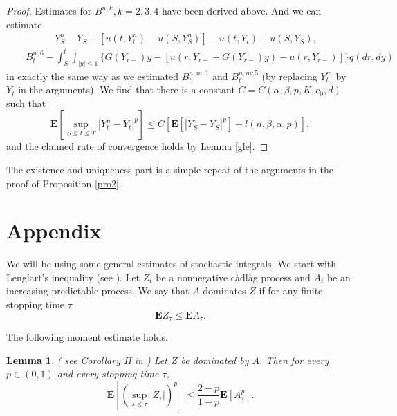 \documentclass[11pt]{amsart}
\theoremstyle{plain}
\newtheorem{lemma}{Lemma}
\numberwithin{equation}{section}
\begin{document}
\begin{proof}
Estimates for $B^{n,k},k=2,3,4$ have been derived above. And we can estimate 
\begin{eqnarray*}
&&\qquad \quad Y_{S}^{n}-Y_{S}+[u\left( t,Y_{t}^{n}\right) -u\left(
S,Y_{S}^{n}\right) ]-u\left( t,Y_{t}\right) -u\left( S,Y_{S}\right) , \\
&&B_{t}^{n,6}-\int_{S}^{t}\int_{\left\vert y\right\vert \leq 1}\{G\left(
Y_{r-}\right) y-\left[ u\left( r,Y_{r-}+G\left( Y_{r-}\right) y\right)
-u\left( r,Y_{r-}\right) \right] \}q\left( dr,dy\right)
\end{eqnarray*}in exactly the same way as we estimated $B_{t}^{n,m;1}$ and $B_{t}^{n,m;5}$
(by replacing $Y_{t}^{m}$ by $Y_{t}$ in the arguments). We find that there
is a constant $C=C\left( \alpha ,\beta ,p,K,c_{0},d\right) $ such that\begin{equation*}
\mathbf{E}\left[ \sup_{S\leq t\leq T}\left\vert Y_{t}^{n}-Y_{t}\right\vert
^{p}\right] \leq C[\mathbf{E}\left[ \left\vert Y_{S}^{n}-Y_{S}\right\vert
^{p}\right] +l\left( n,\beta ,\alpha ,p\right) ],
\end{equation*}and the claimed rate of convergence holds by Lemma \ref{gle}.
\end{proof}

The existence and uniqueness part is a simple repeat of the arguments in the
proof of Proposition \ref{pro2}.

\section{Appendix}

We will be using some general estimates of stochastic integrals. We start
with Lenglart's inequality (see \cite{le}). Let $Z_{t}$ be a nonnegative c\`{a}dl\`{a}g process and $A_{t}$ be an increasing predictable process. We
say that $A$ dominates $Z$ if for any finite stopping time $\tau $ 
\begin{equation*}
\mathbf{E}Z_{\tau }\leq \mathbf{E}A_{\tau }.
\end{equation*}

The following moment estimate holds.

\begin{lemma}
\label{lem3}( see Corollary II in \cite{le}) Let $Z$ be dominated by $A$.
Then for every $p\in \left( 0,1\right) $ and every stopping time $\tau $, 
\begin{equation*}
\mathbf{E}\left[ \left( \sup_{s\leq \tau }\left\vert Z_{\tau }\right\vert
\right) ^{p}\right] \leq \frac{2-p}{1-p}\mathbf{E}\left[ A_{\tau }^{p}\right].
\end{equation*}
\end{lemma}
\end{document}
